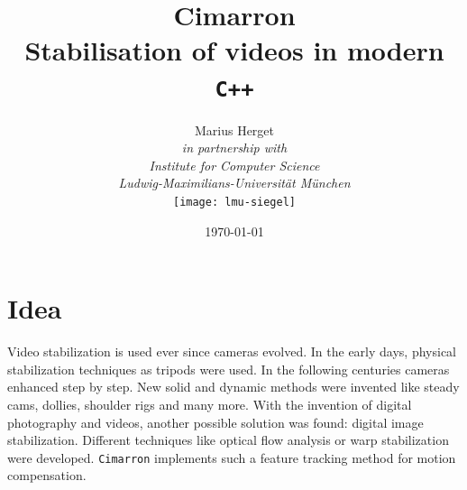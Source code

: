 \newcommand{\pdftitel}{Cimarron Herget 2017}
\newcommand{\autor}{Marius Herget}
\newcommand{\version}{draft} %
\newcommand{\isPrintVersion}{true}




\newcommand{\tbd}[1][null]{
    \ifthenelse{\equal{#1}{null}}
    {\ignorespaces\textit{\impmark\color{orange}\textbf{TBD}}}
    {\ignorespaces\textit{\impmark\color{orange}[TBD: #1]}}
}
\newcommand{\todo}[1][null]{
    \ifthenelse{\equal{#1}{null}}
    {\ignorespaces\textit{\impmark\color{orange}\textbf{TBD}}}
    {\ignorespaces\textit{\impmark\color{orange}[TBD: #1]}}
}



{}
\title{\textbf{Cimarron}\\Stabilisation of videos in modern \texttt{C++}}
\date{\today}
\author{    Marius Herget\\[2em]
            \textit{in partnership with}\\[2em]
            \textit{Institute for Computer Science}\\
            \textit{Ludwig-Maximilians-Universit\"at M\"unchen}\\[3em]
            \texttt{[image: lmu-siegel]}}
\maketitle
\newpage
{}

\section{Idea}
Video stabilization is used ever since cameras evolved. In the early days, physical stabilization techniques as tripods were used. In the following centuries cameras enhanced step by step. New solid and dynamic methods were invented like steady cams, dollies, shoulder rigs and many more. With the invention of digital photography and videos, another possible solution was found: digital image stabilization. Different techniques like optical flow analysis or warp stabilization were developed. \texttt{Cimarron} implements such a feature tracking method for motion compensation.

